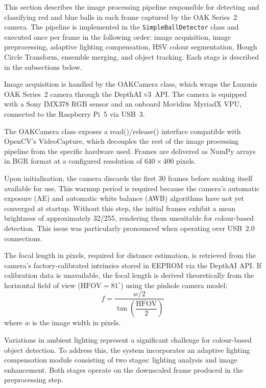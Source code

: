 
This section describes the image processing pipeline responsible for detecting
and classifying red and blue balls in each frame captured by the OAK Series~2
camera. The pipeline is implemented in the \texttt{SimpleBallDetector} class
and executed once per frame in the following order: image acquisition, image preprocessing, adaptive
lighting compensation, HSV colour segmentation, Hough
Circle Transform, ensemble merging, and object tracking. Each stage is
described in the subsections below.


Image acquisition is handled by the OAKCamera class, which wraps the
Luxonis OAK Series~2 camera through the DepthAI v3~API\@. The camera is equipped
with a Sony IMX378 RGB sensor and an onboard Movidius MyriadX VPU, connected to
the Raspberry Pi~5 via USB~3.

The OAKCamera class exposes a read()/release() interface compatible with OpenCV's
VideoCapture, which decouples the rest of the image processing pipeline from the
specific hardware used. Frames are delivered as NumPy arrays in BGR format at a
configured resolution of $640 \times 400$ pixels.

Upon initialisation, the camera discards the first 30 frames before making itself
available for use. This warmup period is required because the camera's automatic
exposure (AE) and automatic white balance (AWB) algorithms have not yet converged
at startup. Without this step, the initial frames exhibit a mean brightness of
approximately 32/255, rendering them unsuitable for colour-based detection. This
issue was particularly pronounced when operating over USB~2.0 connections.

The focal length in pixels, required for distance estimation, is retrieved from the
camera's factory-calibrated intrinsics stored in EEPROM via the DepthAI API\@. If
calibration data is unavailable, the focal length is derived theoretically from the
horizontal field of view ($\mathrm{HFOV} = 81^{\circ}$) using the pinhole camera
model:
\begin{equation}
    f = \frac{w/2}{\tan\!\left(\dfrac{\mathrm{HFOV}}{2}\right)}
\end{equation}
where $w$ is the image width in pixels.


Variations in ambient lighting represent a significant challenge for colour-based object
detection. To address this, the system incorporates an adaptive lighting compensation module
consisting of two stages: lighting analysis and image enhancement. Both stages operate on the
downscaled frame produced in the preprocessing step.

